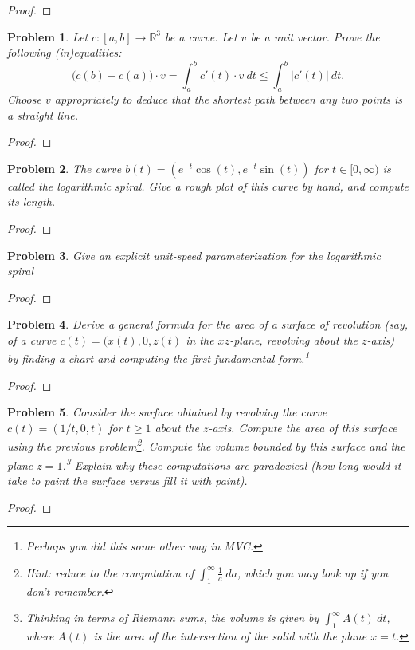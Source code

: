 \documentclass[11pt]{article}
\newtheorem{problem}{Problem}
\begin{document}
\begin{proof}

\end{proof}

\pagebreak

\begin{problem}
Let $c:[a,b]\to\mathbb R^3$ be a curve. Let $v$ be a unit vector. Prove the following (in)equalities: 
\[\big(c(b)-c(a)\big)\cdot v=\int_a^bc'(t)\cdot v\>dt\le\int_a^b|c'(t)|\>dt.\]
Choose $v$ appropriately to deduce that the shortest path between any two points is a straight line. 
\end{problem}

\begin{proof}

\end{proof}

\pagebreak


\begin{problem}
The curve $b(t)=(e^{-t}\cos(t),e^{-t}\sin(t))$ for $t\in[0,\infty)$ is called the logarithmic spiral. Give a rough plot of this curve by hand, and compute its length. 
\end{problem}

\begin{proof}

\end{proof}

\pagebreak

\begin{problem}
Give an explicit unit-speed parameterization for the logarithmic spiral
\end{problem}

\begin{proof}

\end{proof}

\pagebreak


\begin{problem}
Derive a general formula for the area of a surface of revolution (say, of a curve $c(t)=(x(t),0,z(t)$ in the $xz$-plane, revolving about the $z$-axis) by finding a chart and computing the first fundamental form.\footnote{Perhaps you did this some other way in MVC.} 
\end{problem}

\begin{proof}

\end{proof}

\pagebreak

\begin{problem}
Consider the surface obtained by revolving the curve $c(t)=(1/t, 0, t)$ for $t\ge1$ about the $z$-axis. Compute the area of this surface using the previous problem\footnote{Hint: reduce to the computation of $\int_1^\infty\frac{1}{a}\>da$, which you may look up if you don't remember.}. Compute the volume bounded by this surface and the plane $z=1$.\footnote{Thinking in terms of Riemann sums, the volume is given by $\int_1^\infty A(t)\>dt$, where $A(t)$ is the area of the intersection of the solid with the plane $x=t$.} Explain why these computations are paradoxical (how long would it take to paint the surface versus fill it with paint).
\end{problem}

\begin{proof}

\end{proof}
\end{document}
